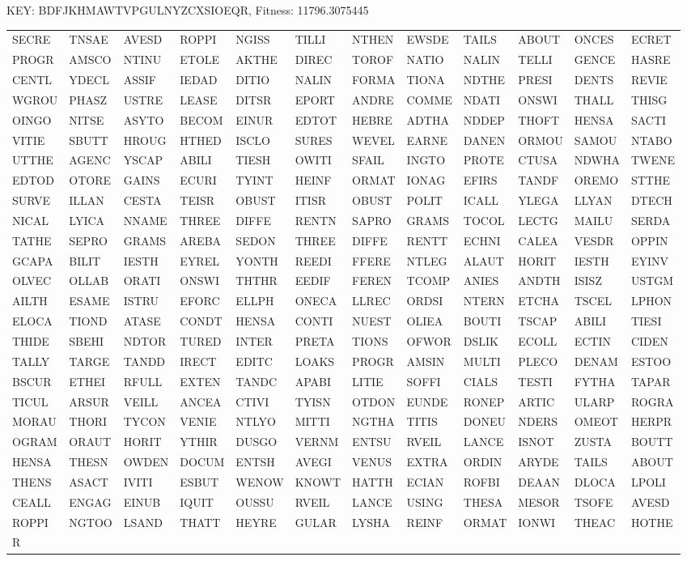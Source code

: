\documentclass{article}
\begin{document}
\begin{enumerate}
  \begin{center}
    KEY: BDFJKHMAWTVPGULNYZCXSIOEQR, Fitness: 11796.3075445
  \end{center}
  \tiny
  \begin{tabular}{llllllllllll}
    SECRE&TNSAE&AVESD&ROPPI&NGISS&TILLI&NTHEN&EWSDE&TAILS&ABOUT&ONCES&ECRET\\
    PROGR&AMSCO&NTINU&ETOLE&AKTHE&DIREC&TOROF&NATIO&NALIN&TELLI&GENCE&HASRE\\
    CENTL&YDECL&ASSIF&IEDAD&DITIO&NALIN&FORMA&TIONA&NDTHE&PRESI&DENTS&REVIE\\
    WGROU&PHASZ&USTRE&LEASE&DITSR&EPORT&ANDRE&COMME&NDATI&ONSWI&THALL&THISG\\
    OINGO&NITSE&ASYTO&BECOM&EINUR&EDTOT&HEBRE&ADTHA&NDDEP&THOFT&HENSA&SACTI\\
    VITIE&SBUTT&HROUG&HTHED&ISCLO&SURES&WEVEL&EARNE&DANEN&ORMOU&SAMOU&NTABO\\
    UTTHE&AGENC&YSCAP&ABILI&TIESH&OWITI&SFAIL&INGTO&PROTE&CTUSA&NDWHA&TWENE\\
    EDTOD&OTORE&GAINS&ECURI&TYINT&HEINF&ORMAT&IONAG&EFIRS&TANDF&OREMO&STTHE\\
    SURVE&ILLAN&CESTA&TEISR&OBUST&ITISR&OBUST&POLIT&ICALL&YLEGA&LLYAN&DTECH\\
    NICAL&LYICA&NNAME&THREE&DIFFE&RENTN&SAPRO&GRAMS&TOCOL&LECTG&MAILU&SERDA\\
    TATHE&SEPRO&GRAMS&AREBA&SEDON&THREE&DIFFE&RENTT&ECHNI&CALEA&VESDR&OPPIN\\
    GCAPA&BILIT&IESTH&EYREL&YONTH&REEDI&FFERE&NTLEG&ALAUT&HORIT&IESTH&EYINV\\
    OLVEC&OLLAB&ORATI&ONSWI&THTHR&EEDIF&FEREN&TCOMP&ANIES&ANDTH&ISISZ&USTGM\\
    AILTH&ESAME&ISTRU&EFORC&ELLPH&ONECA&LLREC&ORDSI&NTERN&ETCHA&TSCEL&LPHON\\
    ELOCA&TIOND&ATASE&CONDT&HENSA&CONTI&NUEST&OLIEA&BOUTI&TSCAP&ABILI&TIESI\\
    THIDE&SBEHI&NDTOR&TURED&INTER&PRETA&TIONS&OFWOR&DSLIK&ECOLL&ECTIN&CIDEN\\
    TALLY&TARGE&TANDD&IRECT&EDITC&LOAKS&PROGR&AMSIN&MULTI&PLECO&DENAM&ESTOO\\
    BSCUR&ETHEI&RFULL&EXTEN&TANDC&APABI&LITIE&SOFFI&CIALS&TESTI&FYTHA&TAPAR\\
    TICUL&ARSUR&VEILL&ANCEA&CTIVI&TYISN&OTDON&EUNDE&RONEP&ARTIC&ULARP&ROGRA\\
    MORAU&THORI&TYCON&VENIE&NTLYO&MITTI&NGTHA&TITIS&DONEU&NDERS&OMEOT&HERPR\\
    OGRAM&ORAUT&HORIT&YTHIR&DUSGO&VERNM&ENTSU&RVEIL&LANCE&ISNOT&ZUSTA&BOUTT\\
    HENSA&THESN&OWDEN&DOCUM&ENTSH&AVEGI&VENUS&EXTRA&ORDIN&ARYDE&TAILS&ABOUT\\
    THENS&ASACT&IVITI&ESBUT&WENOW&KNOWT&HATTH&ECIAN&ROFBI&DEAAN&DLOCA&LPOLI\\
    CEALL&ENGAG&EINUB&IQUIT&OUSSU&RVEIL&LANCE&USING&THESA&MESOR&TSOFE&AVESD\\
    ROPPI&NGTOO&LSAND&THATT&HEYRE&GULAR&LYSHA&REINF&ORMAT&IONWI&THEAC&HOTHE\\
    R
  \end{tabular}
  \normalsize


\end{enumerate}
\end{document}
